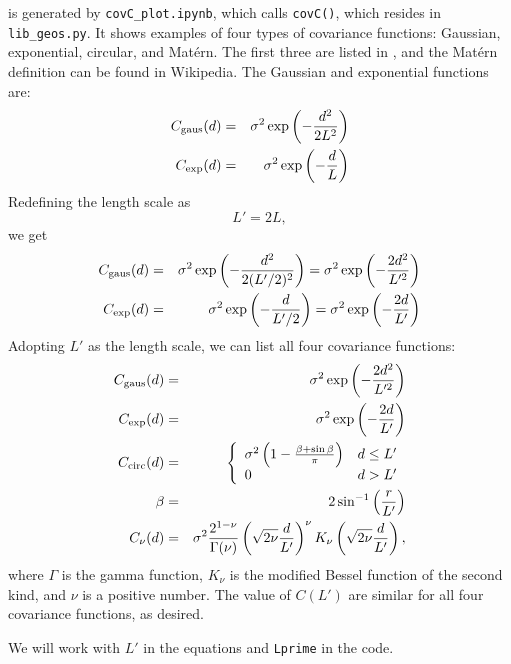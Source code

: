 \documentclass[11pt,titlepage,fleqn]{article}
\begin{document}
 is generated by \verb+covC_plot.ipynb+, which calls \verb+covC()+, which resides in \verb+lib_geos.py+. It shows examples of four types of covariance functions: Gaussian, exponential, circular, and Mat\'ern. The first three are listed in \citet[][p.~111-113]{Tarantola2005}, and the Mat\'ern definition can be found in Wikipedia. The Gaussian and exponential functions are:
%
\begin{eqnarray}
C_{\rm gaus}(d) &=& \sigma^2 \exp \left( - \frac{ d^2}{2L^2} \right)
\label{Cgaus0}
\\
C_{\rm exp}(d) &=& \sigma^2 \exp \left( - \frac{d}{L} \right)
\label{Cexp0}
\end{eqnarray}
%
Redefining the length scale as
%
\begin{equation}
L' = 2L,
\end{equation}
%
we get
%
\begin{eqnarray*}
C_{\rm gaus}(d) &=& \sigma^2 \exp \left( - \frac{ d^2}{2(L'/2)^2} \right) 
= \sigma^2 \exp \left( - \frac{2 d^2}{L'^2} \right) 
\\
C_{\rm exp}(d) &=& \sigma^2 \exp \left( - \frac{d}{L'/2} \right)
= \sigma^2 \exp \left( - \frac{2 d}{L'} \right)
\end{eqnarray*}
%
Adopting $L'$ as the length scale, we can list all four covariance functions:
%
\begin{eqnarray}
C_{\rm gaus}(d) &=& \sigma^2 \exp \left( - \frac{2 d^2}{L'^2} \right) 
\label{Cgaus1}
\\
C_{\rm exp}(d) &=& \sigma^2 \exp \left( - \frac{2 d}{L'} \right)
\label{Cexp1}
\\
C_{\rm circ}(d) &=& \left\{
\begin{array}{ll}
\sigma^2\left(1 - \frac{\beta + \sin\beta}{\pi} \right) & d \le L'
\\
0 \;\;\;\; & d > L'
\end{array}
\right.
\\
\beta &=& 2 \sin^{-1}\left( \frac{r}{L'} \right)
\nonumber
\\
C_\nu(d) &=& \sigma^2 \frac{2^{1-\nu}}{\Gamma(\nu)} \left(\sqrt{2\nu}\frac{d}{L'} \right)^\nu K_\nu\left(\sqrt{2\nu} \frac{d}{L'}\right),
\end{eqnarray}
%
where $\Gamma$ is the gamma function, $K_\nu$ is the modified Bessel function of the second kind, and $\nu$ is a positive number. The value of $C(L')$ are similar for all four covariance functions, as desired.

We will work with $L'$ in the equations and \verb+Lprime+ in the code.
\end{document}
